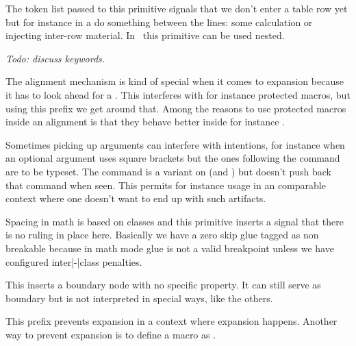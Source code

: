 \stopoldprimitive

\startoldprimitive[title={\prm {noalign}}]

The token list passed to this primitive signals that we don't enter a table row
yet but for instance in a  do something between the lines: some
calculation or injecting inter-row material. In \LUAMETATEX\ this primitive can
be used nested.

{\em Todo: discuss keywords.}

\stopoldprimitive

\startnewprimitive[title={\prm {noaligned}}]

The alignment mechanism is kind of special when it comes to expansion because it
has to look ahead for a . This interferes with for instance
protected macros, but using this prefix we get around that. Among the reasons to
use protected macros inside an alignment is that they behave better inside for
instance .

\stopnewprimitive

\startnewprimitive[title={\prm {noarguments}}]

Sometimes picking up arguments can interfere with intentions, for instance when
an optional argument uses square brackets but the ones following the command are
to be typeset. The  command is a variant on  (and
) but doesn't push back that command when seen. This permits for
instance usage in an  comparable context where one doesn't want to end
up with such artifacts.

\stopnewprimitive

\startnewprimitive[title={\prm {noatomruling}}]

Spacing in math is based on classes and this primitive inserts a signal that
there is no ruling in place here. Basically we have a zero skip glue tagged as
non breakable because in math mode glue is not a valid breakpoint unless we have
configured inter|-|class penalties.

\stopnewprimitive

\startnewprimitive[title={\prm {noboundary}}]

This inserts a boundary node with no specific property. It can still serve as
boundary but is not interpreted in special ways, like the others.

\stopnewprimitive

\startoldprimitive[title={\prm {noexpand}}]

This prefix prevents expansion in a context where expansion happens. Another way
to prevent expansion is to define a macro as .

